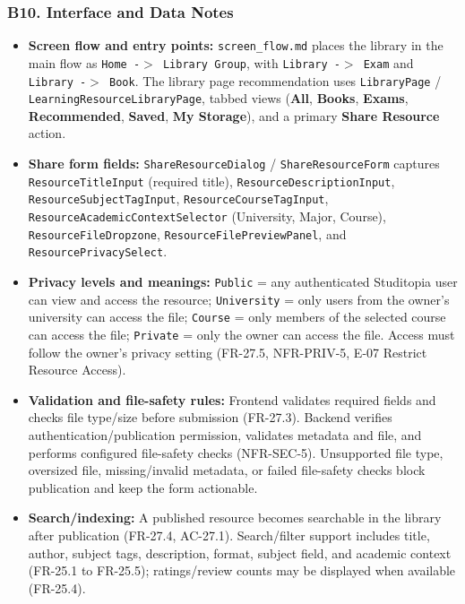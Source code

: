 \documentclass[12pt]{article}
\begin{document}
\hypertarget{sec:b10-interface-and-data-notes}{}
\subsubsection*{B10. Interface and Data Notes}
\par\medskip

\begin{itemize}
\item \textbf{Screen flow and entry points:} \texttt{screen\_flow.md} places the library in the main flow as \texttt{Home -$>$ Library Group}, with \texttt{Library -$>$ Exam} and \texttt{Library -$>$ Book}. The library page recommendation uses \texttt{LibraryPage} / \texttt{LearningResourceLibraryPage}, tabbed views (\textbf{All}, \textbf{Books}, \textbf{Exams}, \textbf{Recommended}, \textbf{Saved}, \textbf{My Storage}), and a primary \textbf{Share Resource} action.
\item \textbf{Share form fields:} \texttt{ShareResourceDialog} / \texttt{ShareResourceForm} captures \texttt{ResourceTitleInput} (required title), \texttt{ResourceDescriptionInput}, \texttt{ResourceSubjectTagInput}, \texttt{ResourceCourseTagInput}, \texttt{ResourceAcademicContextSelector} (University, Major, Course), \texttt{ResourceFileDropzone}, \texttt{ResourceFilePreviewPanel}, and \texttt{ResourcePrivacySelect}.
\item \textbf{Privacy levels and meanings:} \texttt{Public} = any authenticated Studitopia user can view and access the resource; \texttt{University} = only users from the owner's university can access the file; \texttt{Course} = only members of the selected course can access the file; \texttt{Private} = only the owner can access the file. Access must follow the owner's privacy setting (FR-27.5, NFR-PRIV-5, E-07 Restrict Resource Access).
\item \textbf{Validation and file-safety rules:} Frontend validates required fields and checks file type/size before submission (FR-27.3). Backend verifies authentication/publication permission, validates metadata and file, and performs configured file-safety checks (NFR-SEC-5). Unsupported file type, oversized file, missing/invalid metadata, or failed file-safety checks block publication and keep the form actionable.
\item \textbf{Search/indexing:} A published resource becomes searchable in the library after publication (FR-27.4, AC-27.1). Search/filter support includes title, author, subject tags, description, format, subject field, and academic context (FR-25.1 to FR-25.5); ratings/review counts may be displayed when available (FR-25.4).

\end{itemize}
\end{document}
